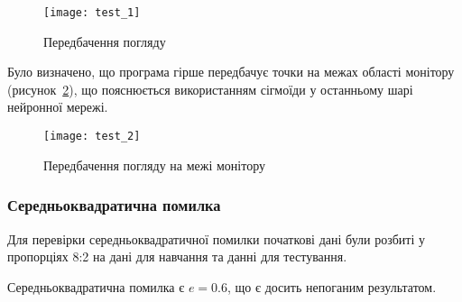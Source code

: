 \begin{figure}[H]
	\centering
	\texttt{[image: test\_1]}
	\caption{Передбачення погляду}
	\label{fig:test_1}
\end{figure} 

Було визначено, що програма гірше передбачує точки на межах області монітору (рисунок~\ref{fig:test_2}), що пояснюється використанням сігмоїди у останньому шарі нейронної мережі.

\begin{figure}[H]
	\centering
	\texttt{[image: test\_2]}
	\caption{Передбачення погляду на межі монітору}
	\label{fig:test_2}
\end{figure} 

\subsubsection{Середньоквадратична помилка}
Для перевірки середньоквадратичної помилки початкові дані були розбиті у пропорціях 8:2 на дані для навчання та данні для тестування.

Середньоквадратична помилка є $e = 0.6$, що є досить непоганим результатом.
